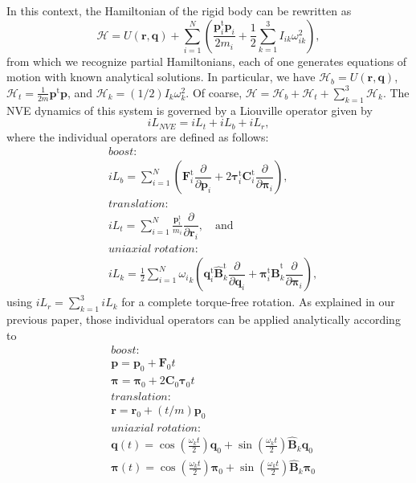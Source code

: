 \documentclass[aip,jcp,reprint,amsmath,amssymb]{revtex4-1}
\newcommand{\mt}[1]{\boldsymbol{\mathbf{#1}}}           %
\newcommand{\vt}[1]{\boldsymbol{\mathbf{#1}}}           %
\newcommand{\tr}[1]{#1^\text{t}}                        %
\newcommand{\diff}[2]{\dfrac{\partial #1}{\partial #2}} %
\begin{document}
In this context, the Hamiltonian of the rigid body can be rewritten as
\begin{equation}
\label{eq:H_split_omega}
\mathcal{H} =  U(\vt r, \vt q) +  \sum_{i=1}^N \left( \frac{\tr{\vt p_i} \vt p_i}{2m_i} + \frac{1}{2} \sum_{k=1}^3 I_{ik} \omega_{ik}^2\right),
\end{equation}
from which we recognize partial Hamiltonians, each of one generates equations of motion with known analytical solutions. In particular, we have $\mathcal{H}_b = U(\vt r, \vt q)$, $\mathcal{H}_{t} = \frac{1}{2m}\tr{\vt p} \vt p$, and $\mathcal{H}_k = (1/2) I_k \omega_k^2$. Of coarse, $\mathcal{H} = \mathcal{H}_b + \mathcal{H}_t + \sum_{k=1}^3 \mathcal{H}_k$. The NVE dynamics of this system is governed by a Liouville operator given by\cite{Abreu_2017}
\begin{equation}
\label{eq:full_operator}
i\!L_{NVE} = i\!L_t + i\!L_b + i\!L_r,
\end{equation}
where the individual operators are defined as follows:
\[
\begin{split}
&boost:\\
&i\!L_b = \sum_{i=1}^N \left( \tr{\vt F}_i \diff{}{\vt p_i} + 2 \tr{\vt \tau}_i \tr{\mt C}_i \diff{}{\vt \pi_i} \right), \\
&translation: \\
& i\!L_t = \sum_{i=1}^N \frac{\tr{\vt p}_i}{m_i}\diff{}{\vt r_i}, \quad \text{and} \\
&uniaxial \; rotation:\\
& i\!L_k = \frac{1}{2} \sum_{i=1}^N {\omega_i}_k \left( \tr{\vt q}_i\tr{\hat{\mt B}_k} \diff{}{\vt q_i} + \tr{\vt \pi_i}\tr{\hat{\mt B}_k} \diff{}{\vt \pi_i} \right),
\end{split}
\]
using $i\!L_r = \sum_{k=1}^3 i\!L_k$ for a complete torque-free rotation. As explained in our previous paper,\cite{Abreu2017} those individual operators can be applied analytically according to
\[
\begin{split}
&boost:\\
&{\vt p} = {\vt p}_0 + {\vt F}_0 t \\
&{\vt \pi} = {\vt \pi}_0 +  2 {\mt C}_0 {\vt \tau}_0 t\\
&translation:\\
&{\vt r} = {\vt r}_0 + (t/m) {\vt p}_0\\
&uniaxial \; rotation:\\
&{\vt q}(t) = \cos\left(\frac{\omega_k t}{2}\right) \vt q_0 + \sin\left(\frac{\omega_k t}{2}\right) \hat{\mt B}_k \vt q_0 \\
&{\vt \pi}(t) = \cos\left(\frac{\omega_k t}{2}\right) \vt \pi_0 + \sin\left(\frac{\omega_k t}{2}\right) \hat{\mt B}_k \vt \pi_0
\end{split}
\]
\end{document}
